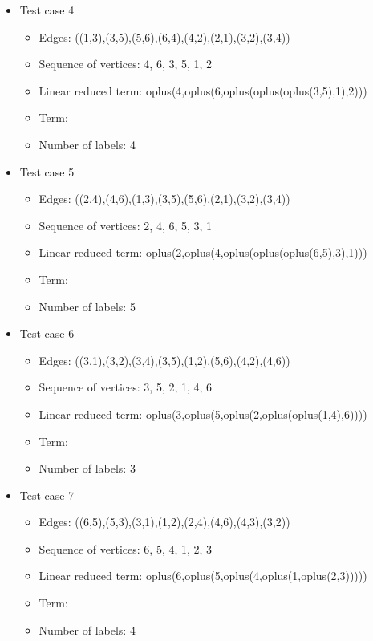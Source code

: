 \documentclass[a4paper, 12pt]{article}
\begin{document}
\begin{itemize}
\item Test case 4
	\begin{itemize}
		\item Edges: ((1,3),(3,5),(5,6),(6,4),(4,2),(2,1),(3,2),(3,4))
		\item Sequence of vertices: 4, 6, 3, 5, 1, 2
		\item Linear reduced term: oplus(4,oplus(6,oplus(oplus(oplus(3,5),1),2)))
		\item Term: 
		\item Number of labels: 4
	\end{itemize}

\item Test case 5
	\begin{itemize}
		\item Edges: ((2,4),(4,6),(1,3),(3,5),(5,6),(2,1),(3,2),(3,4))
		\item Sequence of vertices: 2, 4, 6, 5, 3, 1
		\item Linear reduced term: oplus(2,oplus(4,oplus(oplus(oplus(6,5),3),1)))
		\item Term: 
		\item Number of labels: 5
	\end{itemize}

\item Test case 6
	\begin{itemize}
		\item Edges: ((3,1),(3,2),(3,4),(3,5),(1,2),(5,6),(4,2),(4,6))
		\item Sequence of vertices: 3, 5, 2, 1, 4, 6
		\item Linear reduced term: oplus(3,oplus(5,oplus(2,oplus(oplus(1,4),6))))
		\item Term: 
		\item Number of labels: 3
	\end{itemize}

\item Test case 7
	\begin{itemize}
		\item Edges: ((6,5),(5,3),(3,1),(1,2),(2,4),(4,6),(4,3),(3,2))
		\item Sequence of vertices: 6, 5, 4, 1, 2, 3
		\item Linear reduced term: oplus(6,oplus(5,oplus(4,oplus(1,oplus(2,3)))))
		\item Term: 
		\item Number of labels: 4
	\end{itemize}
\end{itemize}
\end{document}
